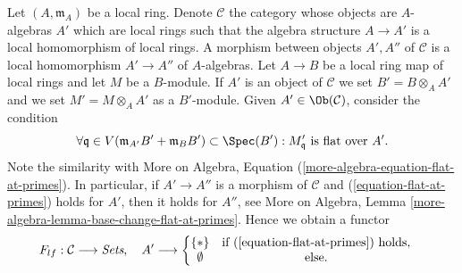 \begin{situation}
\label{situation-flat-at-point}
Let $(A, \mathfrak m_A)$ be a local ring.
Denote $\mathcal{C}$ the category whose objects are $A$-algebras
$A'$ which are local rings such that the algebra structure
$A \to A'$ is a local homomorphism of local rings.
A morphism between objects $A', A''$ of $\mathcal{C}$ is a
local homomorphism $A' \to A''$ of $A$-algebras.
Let $A \to B$ be a local ring map of local rings and let $M$ be a $B$-module.
If $A'$ is an object of $\mathcal{C}$ we set $B' = B \otimes_A A'$
and we set $M' = M \otimes_A A'$ as a $B'$-module.
Given $A' \in \Ob(\mathcal{C})$, consider the condition
\begin{equation}
\label{equation-flat-at-primes}
\forall \mathfrak q \in V(\mathfrak m_{A'}B' + \mathfrak m_B B')
\subset \Spec(B') :
M'_{\mathfrak q}\text{ is flat over }A'.
\end{equation}
Note the similarity with
More on Algebra, Equation (\ref{more-algebra-equation-flat-at-primes}).
In particular, if $A' \to A''$ is a morphism of $\mathcal{C}$ and
(\ref{equation-flat-at-primes}) holds for $A'$, then it holds for $A''$, see
More on Algebra,
Lemma \ref{more-algebra-lemma-base-change-flat-at-primes}.
Hence we obtain a functor
\begin{equation}
\label{equation-flat-at-point}
F_{lf} : \mathcal{C} \longrightarrow \textit{Sets}, \quad
A' \longrightarrow \left\{
\begin{matrix}
\{*\} & \text{if }(\ref{equation-flat-at-primes})\text{ holds}, \\
\emptyset & \text{else.} &
\end{matrix}
\right.
\end{equation}
\end{situation}